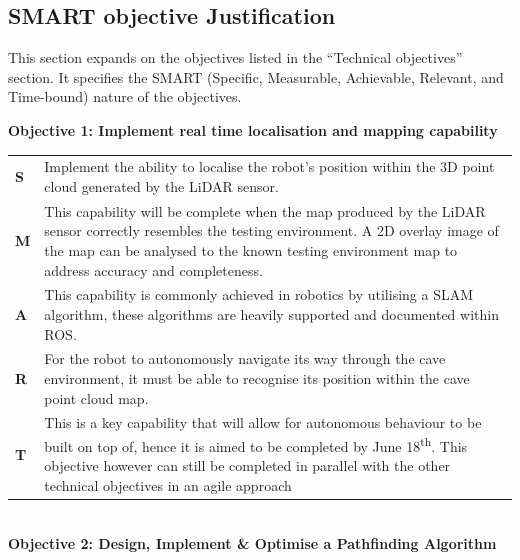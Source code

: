 \subsection{SMART objective Justification}
\label{app:smartobj}
This section expands on the objectives listed in the “Technical objectives” section. It specifies the SMART (Specific, Measurable, Achievable, Relevant, and Time-bound) nature of the objectives.


\textbf{Objective 1: Implement real time localisation and mapping capability}

\bgroup
{}
\begin{tabularx}{\textwidth}{M{1cm}|R{14cm}}
    \textbf{S} & Implement the ability to localise the robot’s position within the 3D point cloud generated by the LiDAR sensor.\\
    \textbf{M} & This capability will be complete when the map produced by the LiDAR sensor correctly resembles the testing environment. A 2D overlay image of the map can be analysed to the known testing environment map to address accuracy and completeness. \\
    \textbf{A} & This capability is commonly achieved in robotics by utilising a SLAM algorithm, these algorithms are heavily supported and documented within ROS. \\
    \textbf{R} & For the robot to autonomously navigate its way through the cave environment, it must be able to recognise its position within the cave point cloud map. \\
    \textbf{T} & This is a key capability that will allow for autonomous behaviour to be built on top of, hence it is aimed to be completed by June 18\textsuperscript{th}. This objective however can still be completed in parallel with the other technical objectives in an agile approach
\end{tabularx}\\


\textbf{Objective 2: Design, Implement \& Optimise a Pathfinding Algorithm}

